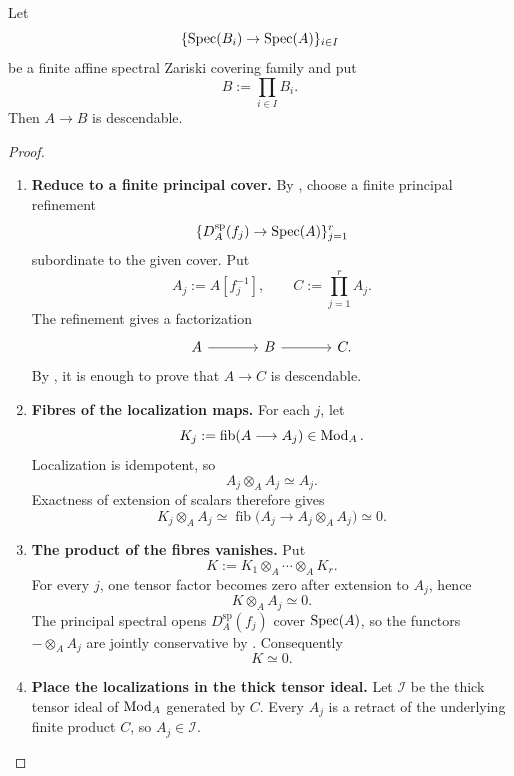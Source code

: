 \begin{proposition}
\label{prop:finite-zariski-covers-descendable}
Let
\[
    \{\operatorname{Spec}(B_i)\to\operatorname{Spec}(A)\}_{i\in I}
\]
be a finite affine spectral Zariski covering family and put
\[
    B:=\prod_{i\in I}B_i.
\]
Then \(A\to B\) is descendable.
\end{proposition}

\begin{proof}
\leavevmode
\begin{enumerate}[label=\textup{(\arabic*)}]
    \item \textbf{Reduce to a finite principal cover.}
    By , choose a finite principal
    refinement
    \[
        \{D_A^{\mathrm{sp}}(f_j)\to\operatorname{Spec}(A)\}_{j=1}^r
    \]
    subordinate to the given cover. Put
    \[
        A_j:=A[f_j^{-1}],
        \qquad
        C:=\prod_{j=1}^rA_j.
    \]
    The refinement gives a factorization
    \[
    \begin{tikzcd}[column sep=large]
        A \arrow[r] & B \arrow[r] & C.
    \end{tikzcd}
    \]
    By , it is enough to prove
    that \(A\to C\) is descendable.

    \item \textbf{Fibres of the localization maps.}
    For each \(j\), let
    \[
        K_j:=\operatorname{fib}(A\longrightarrow A_j)
        \in\operatorname{Mod}_A.
    \]
    Localization is idempotent, so
    \[
        A_j\otimes_AA_j\simeq A_j.
    \]
    Exactness of extension of scalars therefore gives
    \[
        K_j\otimes_AA_j
        \simeq
        \operatorname{fib}
        \bigl(A_j\to A_j\otimes_AA_j\bigr)
        \simeq0.
    \]

    \item \textbf{The product of the fibres vanishes.}
    Put
    \[
        K:=K_1\otimes_A\cdots\otimes_AK_r.
    \]
    For every \(j\), one tensor factor becomes zero after extension to
    \(A_j\), hence
    \[
        K\otimes_AA_j\simeq0.
    \]
    The principal spectral opens \(D_A^{\mathrm{sp}}(f_j)\) cover \(\operatorname{Spec}(A)\), so the functors
    \(-\otimes_AA_j\) are jointly conservative by
    . Consequently
    \[
        K\simeq0.
    \]

    \item \textbf{Place the localizations in the thick tensor ideal.}
    Let \(\mathcal I\) be the thick tensor ideal of \(\operatorname{Mod}_A\) generated by
    \(C\). Every \(A_j\) is a retract of the underlying finite product
    \(C\), so \(A_j\in\mathcal I\).


\end{enumerate}
\end{proof}
